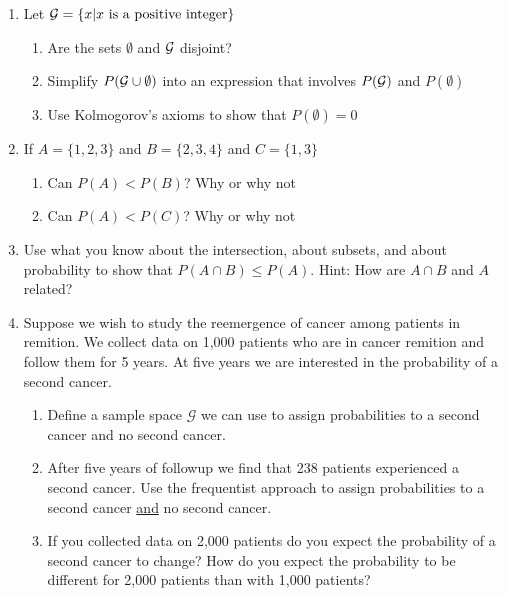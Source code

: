 \begin{enumerate}
    \item Let $\mathcal{G} = \{x | x\text{ is a positive integer}\}$
    \begin{enumerate}
        \item Are the sets $\emptyset$ and $\mathcal{G}$ disjoint?
        \item Simplify $P(\mathcal{G} \cup \emptyset)$ into an expression that involves $P(\mathcal{G})$ and $P(\emptyset)$
        \item Use Kolmogorov's axioms to show that $P(\emptyset) = 0$
    \end{enumerate}
    
    \item If $A=\{1,2,3\}$ and $B = \{2,3,4\}$ and $C = \{1,3\}$
    \begin{enumerate}
        \item Can $P(A) < P(B)$? Why or why not
        \item Can $P(A) < P(C)$? Why or why not
    \end{enumerate}
    \item Use what you know about the intersection, about subsets, and about probability to show that $P(A \cap B) \leq P(A)$. Hint: How are $A \cap B$ and $A$ related?
    \item Suppose we wish to study the reemergence of cancer among patients in remition. We collect data on 1,000 patients who are in cancer remition and follow them for 5 years. At five years we are interested in the probability of a second cancer. 
    \begin{enumerate}
        \item Define a sample space $\mathcal{G}$ we can use to assign probabilities to a second cancer and no second cancer. 
        \item After five years of followup we find that 238 patients experienced a second cancer. Use the frequentist approach to assign probabilities to a second cancer \underline{and} no second cancer.
        \item If you collected data on 2,000 patients do you expect the probability of a second cancer to change? How do you expect the probability to be different for 2,000 patients than with 1,000 patients? 
    \end{enumerate}
    

\end{enumerate}
